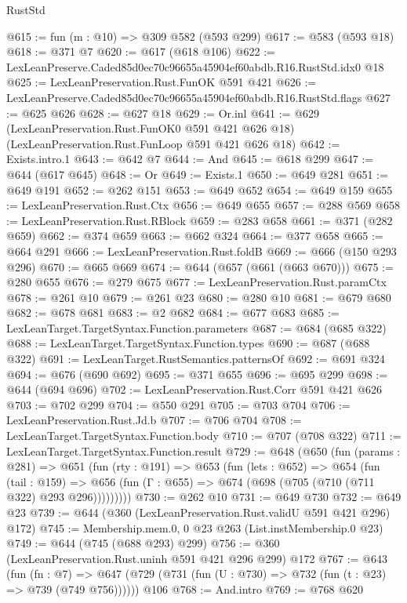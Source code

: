 \begin{lexlean}{RustStd}
\begin{coremodule}
@615 := fun (m : @10) => @309 @582 (@593 @299)
@617 := @583 (@593 @18)
@618 := @371 @7
@620 := @617 (@618 @106)
@622 := LexLeanPreserve.Caded85d0ec70c96655a45904ef60abdb.R16.RustStd.idx0 @18
@625 := LexLeanPreservation.Rust.FunOK @591 @421
@626 := LexLeanPreserve.Caded85d0ec70c96655a45904ef60abdb.R16.RustStd.flags
@627 := @625 @626
@628 := @627 @18
@629 := Or.inl
@641 := @629
    (LexLeanPreservation.Rust.FunOK0 @591 @421 @626 @18)
    (LexLeanPreservation.Rust.FunLoop @591 @421 @626 @18)
@642 := Exists.intro.{1}
@643 := @642 @7
@644 := And
@645 := @618 @299
@647 := @644 (@617 @645)
@648 := Or
@649 := Exists.{1}
@650 := @649 @281
@651 := @649 @191
@652 := @262 @151
@653 := @649 @652
@654 := @649 @159
@655 := LexLeanPreservation.Rust.Ctx
@656 := @649 @655
@657 := @288 @569
@658 := LexLeanPreservation.Rust.RBlock
@659 := @283 @658
@661 := @371 (@282 @659)
@662 := @374 @659
@663 := @662 @324
@664 := @377 @658
@665 := @664 @291
@666 := LexLeanPreservation.Rust.foldB
@669 := @666 (@150 @293 @296)
@670 := @665 @669
@674 := @644 (@657 (@661 (@663 @670)))
@675 := @280 @655
@676 := @279 @675
@677 := LexLeanPreservation.Rust.paramCtx
@678 := @261 @10
@679 := @261 @23
@680 := @280 @10
@681 := @679 @680
@682 := @678 @681
@683 := @2 @682
@684 := @677 @683
@685 := LexLeanTarget.TargetSyntax.Function.parameters
@687 := @684 (@685 @322)
@688 := LexLeanTarget.TargetSyntax.Function.types
@690 := @687 (@688 @322)
@691 := LexLeanTarget.RustSemantics.patternsOf
@692 := @691 @324
@694 := @676 (@690 @692)
@695 := @371 @655
@696 := @695 @299
@698 := @644 (@694 @696)
@702 := LexLeanPreservation.Rust.Corr @591 @421 @626
@703 := @702 @299
@704 := @550 @291
@705 := @703 @704
@706 := LexLeanPreservation.Rust.Jd.b
@707 := @706 @704
@708 := LexLeanTarget.TargetSyntax.Function.body
@710 := @707 (@708 @322)
@711 := LexLeanTarget.TargetSyntax.Function.result
@729 := @648
    (@650
      (fun (params : @281) =>
      @651
        (fun (rty : @191) =>
        @653
          (fun (lets : @652) =>
          @654
            (fun (tail : @159) =>
            @656 (fun (Γ : @655) => @674 (@698 (@705 (@710 (@711 @322) @293 @296)))))))))
@730 := @262 @10
@731 := @649 @730
@732 := @649 @23
@739 := @644 (@360 (LexLeanPreservation.Rust.validU @591 @421 @296) @172)
@745 := Membership.mem.{0, 0} @23 @263 (List.instMembership.{0} @23)
@749 := @644 (@745 (@688 @293) @299)
@756 := @360 (LexLeanPreservation.Rust.uninh @591 @421 @296 @299) @172
@767 := @643
    (fun (fn : @7) =>
    @647 (@729 (@731 (fun (U : @730) => @732 (fun (t : @23) => @739 (@749 @756))))))
    @106
@768 := And.intro
@769 := @768 @620

\end{coremodule}
\end{lexlean}
